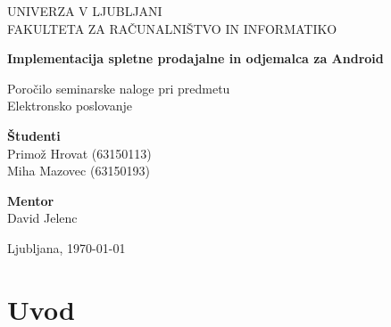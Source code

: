 \documentclass[a4paper,12pt]{report}
\newcommand{\naslov}     {Implementacija spletne prodajalne in odjemalca za Android}
\newcommand{\prviavtor}  {Primož Hrovat}
\newcommand{\prviindeks} {63150113}
\newcommand{\drugiavtor} {Miha Mazovec}
\newcommand{\drugiindeks}{63150193}
\newcommand{\kraj}       {Ljubljana}
\begin{document}
\begin{titlepage}
	\begin{center}
	{UNIVERZA V LJUBLJANI\\[10pt] 
	FAKULTETA ZA RAČUNALNIŠTVO IN INFORMATIKO}

	\vspace{65mm}

	{\Large\textbf{\naslov}}

	\vspace{10mm}

	{\large Poročilo seminarske naloge pri predmetu\\[10pt] Elektronsko poslovanje}

	\vfill
	\vspace{60mm}

\hspace{20mm}
\begin{minipage}[t]{60mm}
	{\bf Študenti}\\
	{\prviavtor} ({\prviindeks})\\ 
	{\drugiavtor} ({\drugiindeks})\\
\end{minipage}
\begin{minipage}[t]{50mm}
	{\bf Mentor}\\
	David Jelenc
\end{minipage}

	\vspace{15mm}

	{	\kraj, \today}
	\end{center}
\end{titlepage}


\tableofcontents


\chapter{Uvod}
\end{document}
